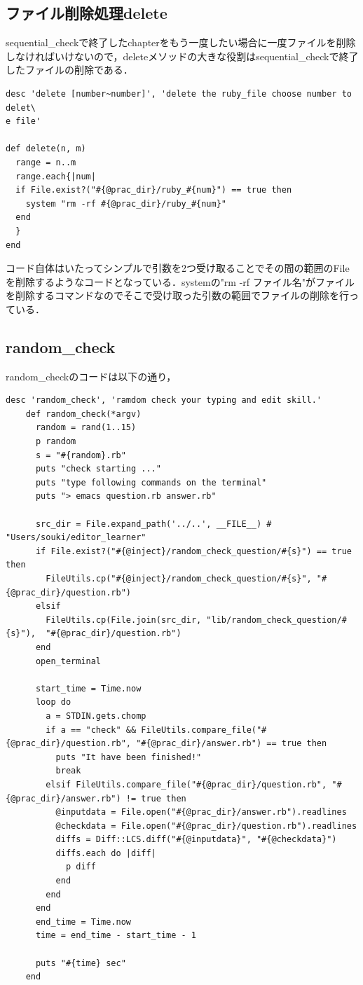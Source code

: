 \documentclass[11pt,dvipdfmx]{jsarticle}
\begin{document}
    \subsection{ファイル削除処理delete}\label{ux30d5ux30a1ux30a4ux30ebux524aux9664ux51e6ux7406delete}

sequential\_checkで終了したchapterをもう一度したい場合に一度ファイルを削除しなければいけないので，deleteメソッドの大きな役割はsequential\_checkで終了したファイルの削除である．

\begin{verbatim}
desc 'delete [number~number]', 'delete the ruby_file choose number to delet\
e file'

def delete(n, m)
  range = n..m
  range.each{|num|
  if File.exist?("#{@prac_dir}/ruby_#{num}") == true then
    system "rm -rf #{@prac_dir}/ruby_#{num}"
  end
  }
end
\end{verbatim}

コード自体はいたってシンプルで引数を2つ受け取ることでその間の範囲のFileを削除するようなコードとなっている．systemの"rm
-rf
ファイル名"がファイルを削除するコマンドなのでそこで受け取った引数の範囲でファイルの削除を行っている．

    \subsection{random\_check}\label{random_check}

random\_checkのコードは以下の通り，

\begin{verbatim}
desc 'random_check', 'ramdom check your typing and edit skill.'
    def random_check(*argv)
      random = rand(1..15)
      p random
      s = "#{random}.rb"
      puts "check starting ..."
      puts "type following commands on the terminal"
      puts "> emacs question.rb answer.rb"

      src_dir = File.expand_path('../..', __FILE__) # "Users/souki/editor_learner"
      if File.exist?("#{@inject}/random_check_question/#{s}") == true then
        FileUtils.cp("#{@inject}/random_check_question/#{s}", "#{@prac_dir}/question.rb")
      elsif
        FileUtils.cp(File.join(src_dir, "lib/random_check_question/#{s}"),  "#{@prac_dir}/question.rb")
      end
      open_terminal
      
      start_time = Time.now
      loop do
        a = STDIN.gets.chomp
        if a == "check" && FileUtils.compare_file("#{@prac_dir}/question.rb", "#{@prac_dir}/answer.rb") == true then
          puts "It have been finished!"
          break
        elsif FileUtils.compare_file("#{@prac_dir}/question.rb", "#{@prac_dir}/answer.rb") != true then
          @inputdata = File.open("#{@prac_dir}/answer.rb").readlines
          @checkdata = File.open("#{@prac_dir}/question.rb").readlines
          diffs = Diff::LCS.diff("#{@inputdata}", "#{@checkdata}")
          diffs.each do |diff|
            p diff
          end
        end
      end
      end_time = Time.now
      time = end_time - start_time - 1
      
      puts "#{time} sec"
    end
\end{verbatim}
\end{document}
